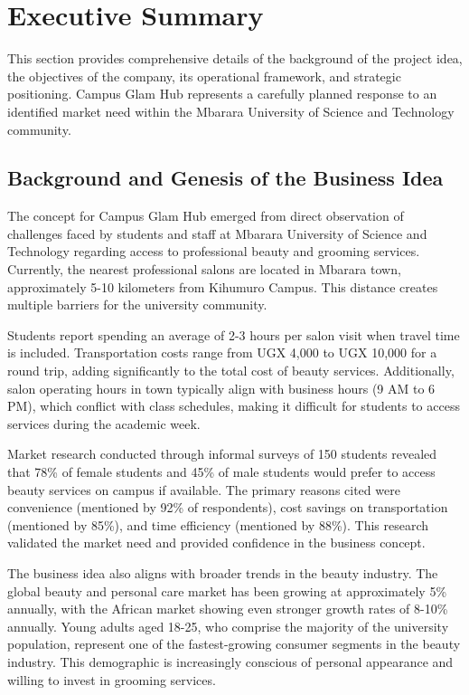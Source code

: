 \section{Executive Summary}

This section provides comprehensive details of the background of the project idea, the objectives of the company, its operational framework, and strategic positioning. Campus Glam Hub represents a carefully planned response to an identified market need within the Mbarara University of Science and Technology community.

\subsection{Background and Genesis of the Business Idea}

The concept for Campus Glam Hub emerged from direct observation of challenges faced by students and staff at Mbarara University of Science and Technology regarding access to professional beauty and grooming services. Currently, the nearest professional salons are located in Mbarara town, approximately 5-10 kilometers from Kihumuro Campus. This distance creates multiple barriers for the university community.

Students report spending an average of 2-3 hours per salon visit when travel time is included. Transportation costs range from UGX 4,000 to UGX 10,000 for a round trip, adding significantly to the total cost of beauty services. Additionally, salon operating hours in town typically align with business hours (9 AM to 6 PM), which conflict with class schedules, making it difficult for students to access services during the academic week.

Market research conducted through informal surveys of 150 students revealed that 78\% of female students and 45\% of male students would prefer to access beauty services on campus if available. The primary reasons cited were convenience (mentioned by 92\% of respondents), cost savings on transportation (mentioned by 85\%), and time efficiency (mentioned by 88\%). This research validated the market need and provided confidence in the business concept.

The business idea also aligns with broader trends in the beauty industry. The global beauty and personal care market has been growing at approximately 5\% annually, with the African market showing even stronger growth rates of 8-10\% annually. Young adults aged 18-25, who comprise the majority of the university population, represent one of the fastest-growing consumer segments in the beauty industry. This demographic is increasingly conscious of personal appearance and willing to invest in grooming services.


